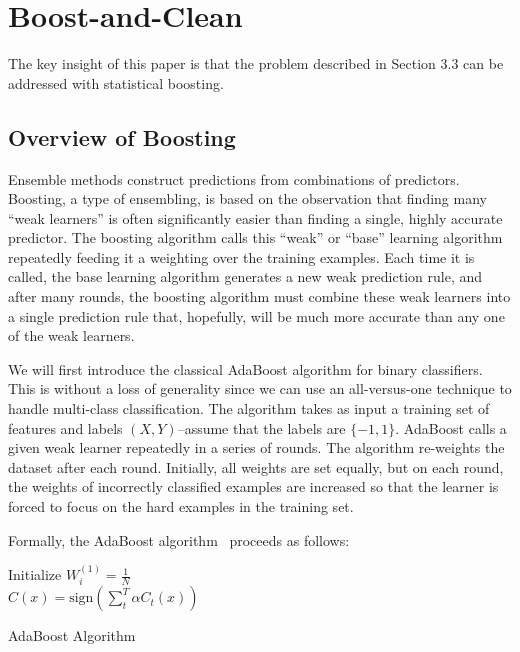 \section{Boost-and-Clean}
The key insight of this paper is that the problem described in Section 3.3 can be addressed with statistical boosting.

\subsection{Overview of Boosting}
Ensemble methods construct predictions from combinations of predictors.
Boosting, a type of ensembling, is based on the observation that finding many ``weak learners'' is often significantly easier than finding a single, highly accurate predictor. 
The boosting algorithm calls this ``weak'' or ``base'' learning algorithm repeatedly feeding it a  weighting over the training examples.
Each time it is called, the base learning algorithm generates a new weak prediction rule, and after many rounds, the boosting algorithm must combine these weak learners into a single prediction rule that, hopefully, will be much more accurate than any one of the weak learners.

We will first introduce the classical AdaBoost algorithm for binary classifiers.
This is without a loss of generality since we can use an all-versus-one technique to handle multi-class classification.
The algorithm takes as input a training set of features and labels $(X,Y)$--assume that the labels are $\{-1, 1\}$.
AdaBoost calls a given weak learner repeatedly in a series of rounds. 
The algorithm re-weights the dataset after each round. Initially, all weights are set equally, but on each round, the weights of incorrectly classified examples are increased so that the learner is forced to focus on the hard examples in the training set.

Formally, the AdaBoost algorithm~\cite{freund1995desicion} proceeds as follows:
\begin{algorithm}
Initialize $W^{(1)}_i = \frac{1}{N}$\\
\Return $C(x) = \text{sign}(\sum_t^T \alpha C_t(x) )$
\caption{AdaBoost Algorithm}
\label{alg:adaboost}
\end{algorithm}

